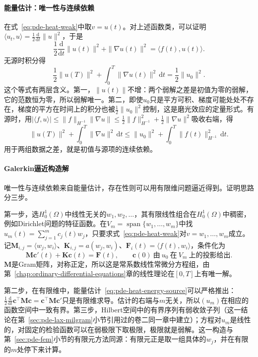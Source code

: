 \paragraph{能量估计：唯一性与连续依赖}
在式~\eqref{eq:pde-heat-weak}中取$v=u(t)$。对上述函数类，可以证明$\langle u_t,u\rangle=\tfrac12\tfrac{\mathrm d}{\mathrm dt}\|u\|^2$，于是
\begin{equation}
  \frac12\frac{\mathrm d}{\mathrm dt}\|u(t)\|^2+\|\nabla u(t)\|^2=\langle f(t),u(t)\rangle .
  \label{eq:pde-heat-energy}
\end{equation}
无源时积分得
\[
  \frac12\|u(T)\|^2+\int_0^T\|\nabla u(t)\|^2\,\mathrm dt=\frac12\|u_0\|^2 .
\]
这个等式有两层含义。第一，$\|u(t)\|$不增：两个弱解之差是初值为零的弱解，它的范数恒为零，所以弱解唯一。第二，即使$u_0$只是平方可积、梯度可能处处不存在，梯度的平方在时间上的积分也被$\tfrac12\|u_0\|^2$控制，这是磨光效应的定量形式。有源时，用$|\langle f,u\rangle|\leq\|f\|_{H^{-1}}\|\nabla u\|\leq\tfrac12\|f\|_{H^{-1}}^2+\tfrac12\|\nabla u\|^2$吸收右端，得
\begin{equation}
  \|u(T)\|^2+\int_0^T\|\nabla u\|^2\,\mathrm dt\leq\|u_0\|^2+\int_0^T\|f(t)\|_{H^{-1}}^2\,\mathrm dt .
  \label{eq:pde-heat-energy-source}
\end{equation}
用于两组数据之差，就是初值与源项的连续依赖。

\paragraph{Galerkin逼近构造解}
唯一性与连续依赖来自能量估计，存在性则可以用有限维问题逼近得到。证明思路分三步。

第一步，选$H_0^1(\Omega)$中线性无关的$w_1,w_2,\ldots$，其有限线性组合在$H_0^1(\Omega)$中稠密，例如Dirichlet问题的特征函数。在$V_m=\operatorname{span}\{w_1,\ldots,w_m\}$中找$u_m(t)=\sum_{j=1}^mc_j(t)w_j$，只要求式~\eqref{eq:pde-heat-weak}对$v=w_1,\ldots,w_m$成立。记$\bm M_{i,j}=\langle w_j,w_i\rangle$、$\bm K_{i,j}=a(w_j,w_i)$、$\bm F_i(t)=\langle f(t),w_i\rangle$，条件化为
\[
  \bm M\bm c'(t)+\bm K\bm c(t)=\bm F(t),\qquad\bm c(0)\ \text{由}\ u_0\ \text{在}\ V_m\ \text{上的投影给出}.
\]
$\bm M$是Gram矩阵，对称正定，所以这是常系数线性常微分方程组，由第~\ref{chap:ordinary-differential-equations}章的线性理论在$[0,T]$上有唯一解。

第二步，在有限维中，能量估计~\eqref{eq:pde-heat-energy-source}可以严格推出：$\tfrac12\tfrac{\mathrm d}{\mathrm dt}\bm c^{\top}\bm M\bm c=\bm c^{\top}\bm M\bm c'$只是有限维求导。估计的右端与$m$无关，所以$(u_m)$在相应的函数空间中一致有界。第三步，Hilbert空间中的有界序列有弱收敛子列（这一结论在第~\ref{sec:pde-lax-milgram}小节引用过的卷二同一章中建立）；方程对$u_m$是线性的，对固定的检验函数可以在弱极限下取极限，极限就是弱解。这一构造与第~\ref{sec:pde-fem}小节的有限元方法同源：有限元正是取一组具体的$w_j$，并在有限的$m$处停下来计算。

